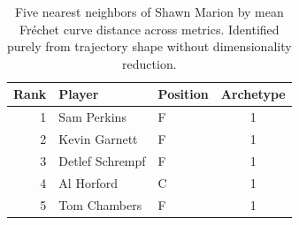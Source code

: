 \begin{table}[htbp]
  \centering\small
  \begin{tabular}{rllc}
    \toprule
    Rank & Player & Position & Archetype \\
    \midrule
    1 & Sam Perkins & F & 1 \\
    2 & Kevin Garnett & F & 1 \\
    3 & Detlef Schrempf & F & 1 \\
    4 & Al Horford & C & 1 \\
    5 & Tom Chambers & F & 1 \\
    \bottomrule
  \end{tabular}
  \caption{Five nearest neighbors of Shawn Marion by mean Fr\'{e}chet curve distance across metrics. Identified purely from trajectory shape without dimensionality reduction.}
  \label{tab:Shawn_Marion_frechet_curve_neighbors}
\end{table}

